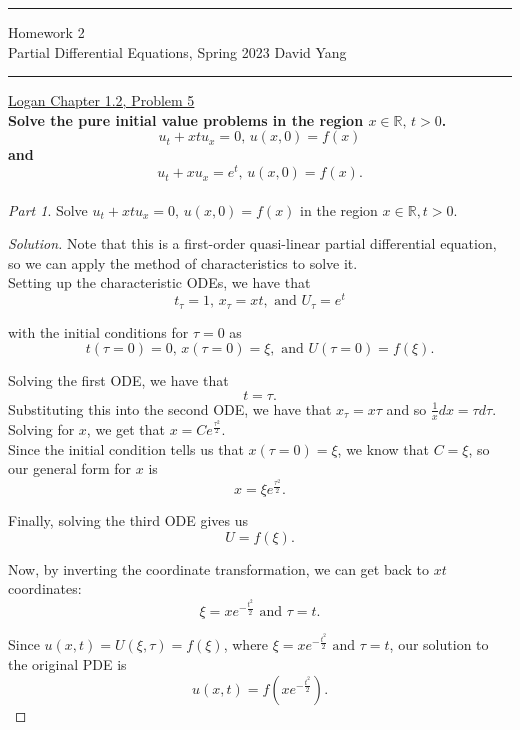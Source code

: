 \documentclass[11pt]{article}
\newenvironment{solution}
  {\renewcommand\qedsymbol{$\blacksquare$}\begin{proof}[Solution]}
  {\end{proof}}
\begin{document}
	\hrule
	\begin{center}
		{\Large Homework 2} \\ %
		\vspace{0.2cm}
		Partial Differential Equations, Spring 2023 \hfill David Yang %
	\end{center}

\hrule

\vspace{1em}

\underline{Logan Chapter 1.2, Problem 5} \\

\textbf{Solve the pure initial value problems in the region $x \in \mathbb{R}, \, t > 0$. $$u_t + xtu_x = 0, \, u(x, 0) = f(x)$$ and $$u_t + xu_x = e^t, \, u(x, 0) = f(x).$$} \\

\textit{Part 1}. Solve $u_t + xtu_x = 0, \, u(x, 0) = f(x)$ in the region $x\in \mathbb{R}, t > 0.$
\begin{solution} 
Note that this is a first-order quasi-linear partial differential equation, so we can apply the method of characteristics to solve it. \\

Setting up the characteristic ODEs, we have that $$ t_\tau = 1, \, x_\tau = xt, \text { and } U_\tau = e^t$$

with the initial conditions for $\tau = 0$ as $$ t(\tau = 0) = 0, \, x(\tau = 0) = \xi, \text { and } U(\tau = 0) = f(\xi).$$

Solving the first ODE, we have that $$t = \tau.$$ Substituting this into the second ODE, we have that $x_\tau = x\tau$ and so $\frac{1}{x} dx = \tau d\tau.$ Solving for $x$, we get that $x = Ce^{\frac{\tau^2}{2}}.$ \\

Since the initial condition tells us that $x(\tau = 0) = \xi$, we know that $C = \xi$, so our general form for $x$ is $$ x = \xi e^{\frac{\tau^2}{2}}.$$

Finally, solving the third ODE gives us $$U = f(\xi).$$

Now, by inverting the coordinate transformation, we can get back to $xt$ coordinates: $$\xi = xe^{-\frac{t^2}{2}} \text { and } \tau = t.$$

Since $u(x, t) = U(\xi, \tau) = f(\xi)$, where $\xi = xe^{-\frac{t^2}{2}} \text { and } \tau = t$, our  solution to the original PDE is $$\boxed{u(x, t) = f\left(xe^{-\frac{t^2}{2}}\right)}.$$

\end{solution}
\end{document}
